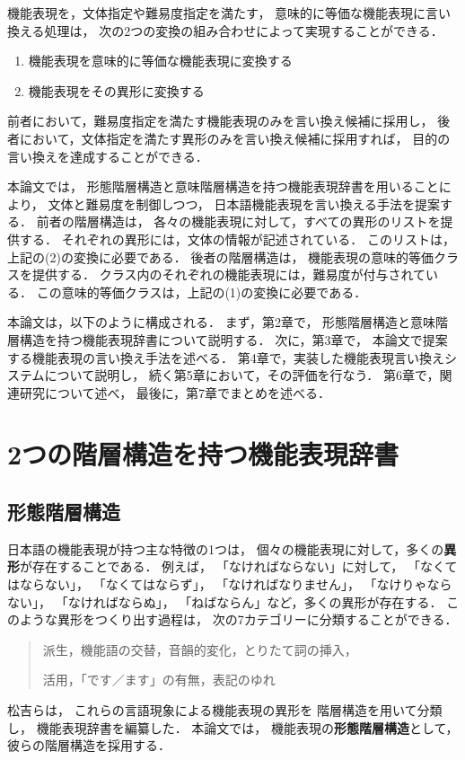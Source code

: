 \documentclass[japanese]{jnlp_1.4}
\begin{document}
機能表現を，文体指定や難易度指定を満たす，
意味的に等価な機能表現に言い換える処理は，
次の2つの変換の組み合わせによって実現することができる．
\begin{enumerate}
\item 機能表現を意味的に等価な機能表現に変換する
\item 機能表現をその異形に変換する
\end{enumerate}
前者において，難易度指定を満たす機能表現のみを言い換え候補に採用し，
後者において，文体指定を満たす異形のみを言い換え候補に採用すれば，
目的の言い換えを達成することができる．

本論文では，
形態階層構造と意味階層構造を持つ機能表現辞書を用いることにより，
文体と難易度を制御しつつ，
日本語機能表現を言い換える手法を提案する．
前者の階層構造は，
各々の機能表現に対して，すべての異形のリストを提供する．
それぞれの異形には，文体の情報が記述されている．
このリストは，上記の(2)の変換に必要である．
後者の階層構造は，
機能表現の意味的等価クラスを提供する．
クラス内のそれぞれの機能表現には，難易度が付与されている．
この意味的等価クラスは，上記の(1)の変換に必要である．

本論文は，以下のように構成される．
まず，第2章で，
形態階層構造と意味階層構造を持つ機能表現辞書について説明する．
次に，第3章で，
本論文で提案する機能表現の言い換え手法を述べる．
第4章で，実装した機能表現言い換えシステムについて説明し，
続く第5章において，その評価を行なう．
第6章で，関連研究について述べ，
最後に，第7章でまとめを述べる．



\section{2つの階層構造を持つ機能表現辞書}
\label{sec:dic}

\subsection{形態階層構造}
\label{subsec:morph}

日本語の機能表現が持つ主な特徴の1つは，
個々の機能表現に対して，多くの{\bf 異形}が存在することである．
例えば，
「なければならない」に対して，
「なくてはならない」，
「なくてはならず」，
「なければなりません」，
「なけりゃならない」，
「なければならぬ」，
「ねばならん」など，多くの異形が存在する．
このような異形をつくり出す過程は，
次の7カテゴリーに分類することができる．
\begin{quote}
派生，機能語の交替，音韻的変化，とりたて詞の挿入，

活用，「です／ます」の有無，表記のゆれ
\end{quote}
松吉らは，
これらの言語現象による機能表現の異形を
階層構造を用いて分類し，
機能表現辞書を編纂した．
本論文では，
機能表現の\textbf{形態階層構造}として，
彼らの階層構造を採用する．
\end{document}
